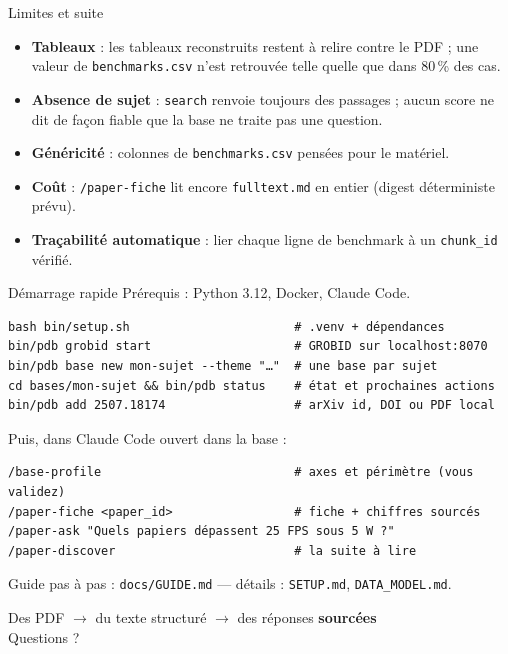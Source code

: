 \documentclass[aspectratio=169,11pt]{beamer}
\newcommand{\cmd}[1]{\texttt{\textcolor{blu}{#1}}}
\begin{document}
\begin{frame}{Limites et suite}
  \begin{itemize}
    \item \textbf{Tableaux} : les tableaux reconstruits restent à relire contre le PDF ;
          une valeur de \texttt{benchmarks.csv} n'est retrouvée telle quelle que dans 80\,\% des cas.
    \item \textbf{Absence de sujet} : \cmd{search} renvoie toujours des passages ; aucun score ne dit
          de façon fiable que la base ne traite pas une question.
    \item \textbf{Généricité} : colonnes de \texttt{benchmarks.csv} pensées pour le matériel.
    \item \textbf{Coût} : \cmd{/paper-fiche} lit encore \texttt{fulltext.md} en entier
          (digest déterministe prévu).
    \item \textbf{Traçabilité automatique} : lier chaque ligne de benchmark à un \texttt{chunk\_id} vérifié.
  \end{itemize}
\end{frame}

\begin{frame}[fragile]{Démarrage rapide}
  Prérequis : Python 3.12, Docker, Claude Code.
\begin{lstlisting}
bash bin/setup.sh                       # .venv + dépendances
bin/pdb grobid start                    # GROBID sur localhost:8070
bin/pdb base new mon-sujet --theme "…"  # une base par sujet
cd bases/mon-sujet && bin/pdb status    # état et prochaines actions
bin/pdb add 2507.18174                  # arXiv id, DOI ou PDF local
\end{lstlisting}
  Puis, dans Claude Code ouvert dans la base :
\begin{lstlisting}
/base-profile                           # axes et périmètre (vous validez)
/paper-fiche <paper_id>                 # fiche + chiffres sourcés
/paper-ask "Quels papiers dépassent 25 FPS sous 5 W ?"
/paper-discover                         # la suite à lire
\end{lstlisting}
  {\small Guide pas à pas : \texttt{docs/GUIDE.md} --- détails : \texttt{SETUP.md}, \texttt{DATA\_MODEL.md}.}
\end{frame}

\begin{frame}[standout]
  Des PDF \(\to\) du texte structuré \(\to\) des réponses \textbf{sourcées}\\[1em]
  \normalsize Questions ?
\end{frame}
\end{document}
